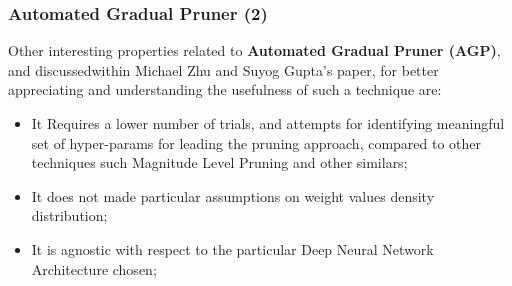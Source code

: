 \begin{frame}
    \frametitle{Automated Gradual Pruner (2)}
        Other interesting properties related to \textbf{Automated Gradual Pruner (AGP)}, and discussedwithin Michael Zhu and Suyog Gupta's paper,
            for better appreciating and understanding the usefulness of such a technique are:

        \begin{itemize}
        \item It Requires a lower number of trials, and attempts for identifying meaningful set of hyper-params for leading the pruning approach,
            compared to other techniques such Magnitude Level Pruning and other similars;
        \item It does not made particular assumptions on weight values density distribution;
        \item It is agnostic with respect to the particular Deep Neural Network Architecture chosen;
        \end{itemize}
\end{frame}
